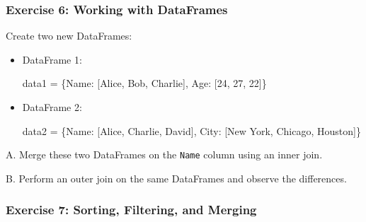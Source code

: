 \documentclass[
  letterpaper,
  DIV=11,
  numbers=noendperiod]{scrreprt}
\newenvironment{Shaded}{\begin{snugshade}}{\end{snugshade}}
\newcommand{\DecValTok}[1]{\textcolor[rgb]{0.68,0.00,0.00}{#1}}
\newcommand{\NormalTok}[1]{\textcolor[rgb]{0.00,0.23,0.31}{#1}}
\newcommand{\OperatorTok}[1]{\textcolor[rgb]{0.37,0.37,0.37}{#1}}
\newcommand{\StringTok}[1]{\textcolor[rgb]{0.13,0.47,0.30}{#1}}
\begin{document}
\hypertarget{exercise-6-working-with-dataframes}{%
\subsubsection{Exercise 6: Working with
DataFrames}\label{exercise-6-working-with-dataframes}}

Create two new DataFrames:

\begin{itemize}
\item
  DataFrame 1:

\begin{Shaded}
\begin{Highlighting}[]
\NormalTok{data1 }\OperatorTok{=}\NormalTok{ \{}\StringTok{\textquotesingle{}Name\textquotesingle{}}\NormalTok{: [}\StringTok{\textquotesingle{}Alice\textquotesingle{}}\NormalTok{, }\StringTok{\textquotesingle{}Bob\textquotesingle{}}\NormalTok{, }\StringTok{\textquotesingle{}Charlie\textquotesingle{}}\NormalTok{],}
         \StringTok{\textquotesingle{}Age\textquotesingle{}}\NormalTok{: [}\DecValTok{24}\NormalTok{, }\DecValTok{27}\NormalTok{, }\DecValTok{22}\NormalTok{]\}}
\end{Highlighting}
\end{Shaded}
\item
  DataFrame 2:

\begin{Shaded}
\begin{Highlighting}[]
\NormalTok{data2 }\OperatorTok{=}\NormalTok{ \{}\StringTok{\textquotesingle{}Name\textquotesingle{}}\NormalTok{: [}\StringTok{\textquotesingle{}Alice\textquotesingle{}}\NormalTok{, }\StringTok{\textquotesingle{}Charlie\textquotesingle{}}\NormalTok{, }\StringTok{\textquotesingle{}David\textquotesingle{}}\NormalTok{],}
         \StringTok{\textquotesingle{}City\textquotesingle{}}\NormalTok{: [}\StringTok{\textquotesingle{}New York\textquotesingle{}}\NormalTok{, }\StringTok{\textquotesingle{}Chicago\textquotesingle{}}\NormalTok{, }\StringTok{\textquotesingle{}Houston\textquotesingle{}}\NormalTok{]\}}
\end{Highlighting}
\end{Shaded}
\end{itemize}

A. Merge these two DataFrames on the \texttt{Name} column using an inner
join.

B. Perform an outer join on the same DataFrames and observe the
differences.

\hypertarget{exercise-7-sorting-filtering-and-merging}{%
\subsubsection{Exercise 7: Sorting, Filtering, and
Merging}\label{exercise-7-sorting-filtering-and-merging}}
\end{document}
